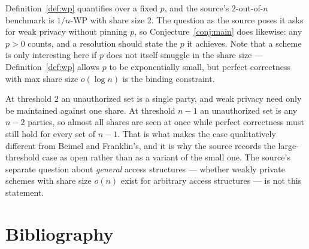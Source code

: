 \documentclass{aicr-conjecture}
\begin{document}
\begin{remark}
Definition~\ref{def:wp} quantifies over a fixed $p$, and the source's
$2$-out-of-$n$ benchmark is $1/n$-WP with share size $2$. The question as
the source poses it asks for weak privacy without pinning $p$, so
Conjecture~\ref{conj:main} does likewise: any $p > 0$ counts, and a
resolution should state the $p$ it achieves. Note that a scheme is only
interesting here if $p$ does not itself smuggle in the share size ---
Definition~\ref{def:wp} allows $p$ to be exponentially small, but perfect
correctness with max share size $o(\log n)$ is the binding constraint.
\end{remark}

\begin{remark}
At threshold $2$ an unauthorized set is a single party, and weak privacy
need only be maintained against one share. At threshold $n-1$ an
unauthorized set is any $n-2$ parties, so almost all shares are seen at
once while perfect correctness must still hold for every set of $n-1$.
That is what makes the case qualitatively different from Beimel and
Franklin's, and it is why the source records the large-threshold case as
open rather than as a variant of the small one. The source's separate
question about \emph{general} access structures --- whether weakly
private schemes with share size $o(n)$ exist for arbitrary access
structures --- is not this statement.
\end{remark}

\section{Bibliography}
\end{document}
